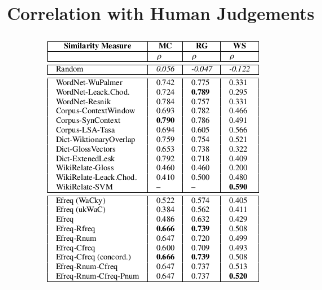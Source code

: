 \documentclass{beamer}
\begin{document}
\begin{frame}
\frametitle{Correlation with Human Judgements}

\begin{figure}	
	\centering
	\includegraphics[width=0.5\textwidth]{figures/res-hj}
\end{figure}

\end{frame}
\end{document}
